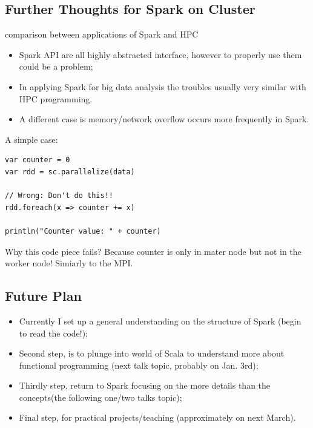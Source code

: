 \documentclass[notheorems, aspectratio=54]{beamer}
\begin{document}
\subsection{Further Thoughts for Spark on Cluster}
\begin{frame}[fragile]

\begin{block}{comparison between applications of Spark and HPC}
 \begin{itemize}
 \item Spark API are all highly abstracted interface, however to properly use them could be a problem;
 \item In applying Spark for big data analysis the troubles usually very similar with HPC programming.
 \item A different case is memory/network overflow occurs more frequently in Spark.
\end{itemize}
\end{block}

A simple case:
\begin{verbatim}
var counter = 0
var rdd = sc.parallelize(data)

// Wrong: Don't do this!!
rdd.foreach(x => counter += x)

println("Counter value: " + counter)
\end{verbatim}

\begin{block}{Why this code piece fails?}
Because counter is only in mater node but not in the worker node! Simiarly to the MPI.
\end{block}

\end{frame}

\subsection{Future Plan}
\begin{frame}


 \begin{itemize}
 \item Currently I set up a general understanding on the structure of Spark (begin to read the code!); 
 \item Second step, is to plunge into world of Scala to understand more about functional programming (next talk topic, probably on Jan. 3rd);
 \item Thirdly step, return to Spark focusing on the more details than the concepts(the following one/two talks topic);
 \item Final step, for practical projects/teaching (approximately on next March).
\end{itemize}

\end{frame}
\end{document}
